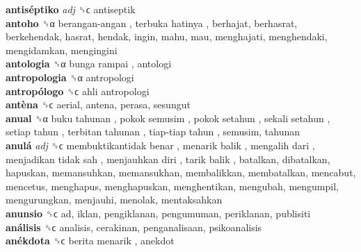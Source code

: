 \textbf{antiséptiko} \emph{adj}  ␝ϲ  antiseptik  \\
\textbf{antoho} ␝α   berangan-angan ,  terbuka hatinya , berhajat, berhasrat, berkehendak, hasrat, hendak, ingin, mahu, mau, menghajati, menghendaki, mengidamkan, mengingini  \\
\textbf{antologia} ␝α   bunga rampai , antologi  \\
\textbf{antropologia} ␝α  antropologi  \\
\textbf{antropólogo} ␝ϲ   ahli antropologi   \\
\textbf{antèna} ␝ϲ  aerial, antena, perasa, sesungut  \\
\textbf{anual} ␝α   buku tahunan ,  pokok semusim ,  pokok setahun ,  sekali setahun ,  setiap tahun ,  terbitan tahunan ,  tiap-tiap tahun , semusim, tahunan  \\
\textbf{anulá} \emph{adj}  ␝ϲ   membuktikantidak benar ,  menarik balik ,  mengalih dari ,  menjadikan tidak sah ,  menjauhkan diri ,  tarik balik , batalkan, dibatalkan, hapuskan, memansuhkan, memansukhan, membalikkan, membatalkan, mencabut, mencetus, menghapus, menghapuskan, menghentikan, mengubah, mengumpil, mengurungkan, menjauhi, menolak, mentaksahkan  \\
\textbf{anunsio} ␝ϲ  ad, iklan, pengiklanan, pengumuman, periklanan, publisiti  \\
\textbf{análisis} ␝ϲ  analisis, cerakinan, penganalisaan, psikoanalisis  \\
\textbf{anékdota} ␝ϲ   berita menarik , anekdot  \\
